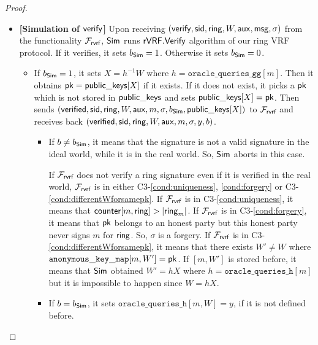 \begin{proof}
\begin{itemize}
		
		\item \textbf{[Simulation of $ \mathsf{verify} $]} Upon receiving  $(\mathsf{verify}, \textsf{sid}, \mathsf{ring},W, \mathsf{aux},\mathsf{msg}, \sigma)$ from the functionality $\mathcal{F}_{\textsf{rvrf}}$, $ \mathsf{Sim} $ runs $ {\mathsf{rVRF}}.{\mathsf{Verify}} $ algorithm of our ring VRF protocol. If  it verifies, it sets $ b_{\mathsf{Sim}} =1 $. Otherwise it sets $ b_{\mathsf{Sim}} =0  $.
		
		\begin{itemize}
			\item 		If $ b_{\mathsf{Sim}} = 1 $, it sets $ X = h^{-1} W$ where $ h = \mathtt{oracle\_queries\_gg}[m] $. Then it obtains $ \mathsf{pk}  = {\mathsf{public\_keys}}[X]$ if it exists. If it does not exist, it picks a $ \mathsf{pk}  $ which is not stored in $ {\mathsf{public\_keys}} $ and sets $ {\mathsf{public\_keys}}[X] = \mathsf{pk} $. Then sends  $ (\mathsf{verified}, \textsf{sid}, \mathsf{ring}, W,\mathsf{aux}, m, \sigma, b_{\mathsf{Sim}}, {\mathsf{public\_keys}}[X]) $ to $ \mathcal{F}_{\textsf{rvrf}} $ and receives back $ (\mathsf{verified}, \textsf{sid}, \mathsf{ring}, W, \mathsf{aux}, m, \sigma, y, b) $. 
			\begin{itemize}
				\item If $ b \neq b_{\mathsf{Sim}} $, it means that the signature is not a valid signature in the ideal world, while it is in the real world. So, $ \mathsf{Sim} $ aborts in this case.
				
				If $ \mathcal{F}_{\textsf{rvrf}} $ does not verify a ring signature even if  it is verified in the real world, $ \mathcal{F}_{\textsf{rvrf}} $ is in either C3-\ref{cond:uniqueness}, \ref{cond:forgery} or C3-\ref{cond:differentWforsamepk}.
				If $ \mathcal{F}_{\textsf{rvrf}} $ is in C3-\ref{cond:uniqueness}, it means that $ \mathsf{counter}[m,\mathsf{ring}] > |\mathsf{ring}_m| $. If $ \mathcal{F}_{\textsf{rvrf}} $ is in C3-\ref{cond:forgery}, it means that $ \mathsf{pk}$ belongs to an honest party but this honest party never signs $ m $ for  $ \mathsf{ring} $. So, $ \sigma $ is a forgery.	 If $ \mathcal{F}_{\textsf{rvrf}} $ is in C3- \ref{cond:differentWforsamepk}, it means that there exists $ W' \neq W $ where $ \mathtt{anonymous\_key\_map}[m,W'] = \mathsf{pk}$. If $ [m,W'] $ is stored before, it means that $ \mathsf{Sim} $ obtained $ W' = hX $ where $ h = \mathtt{oracle\_queries\_h}[m] $ but it is impossible to happen since $ W = hX $.
				\item If $ b = b_{\mathsf{Sim}} $, it sets $ \mathtt{oracle\_queries\_h}[m,W] = y $, if it is not defined before.
				

\end{itemize}
\end{itemize}
\end{itemize}
\end{proof}
